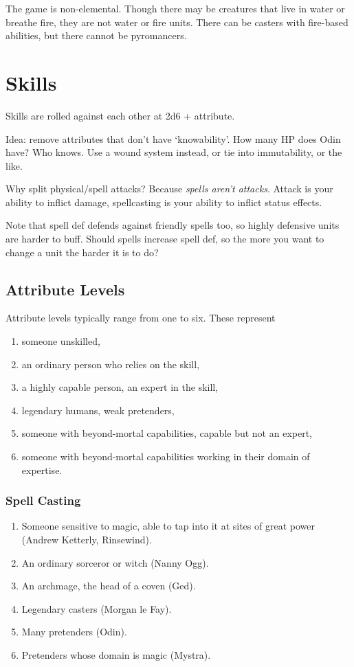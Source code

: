\documentclass[12pt,letterpaper]{article}
\begin{document}
The game is non-elemental.
Though there may be creatures that live in water
or breathe fire, they are not water or fire units.
There can be casters with fire-based abilities,
but there cannot be pyromancers.

\section{Skills}

Skills are rolled against each other at 2d6 + attribute.

Idea: remove attributes that don't have `knowability'.
How many HP does Odin have? Who knows.
Use a wound system instead, or tie into immutability, or the like.

Why split physical/spell attacks?
Because \emph{spells aren't attacks}.
Attack is your ability to inflict damage,
spellcasting is your ability to inflict status effects.

Note that spell def defends against friendly spells too,
so highly defensive units are harder to buff.
Should spells increase spell def,
so the more you want to change a unit the harder it is to do?

\subsection{Attribute Levels}

Attribute levels typically range from one to six.
These represent

\begin{enumerate}
	\item someone unskilled,
	\item an ordinary person who relies on the skill,
	\item a highly capable person, an expert in the skill,
	\item legendary humans, weak pretenders,
	\item someone with beyond-mortal capabilities, capable but not an expert,
	\item someone with beyond-mortal capabilities working in their domain of expertise.
\end{enumerate}

\subsubsection{Spell Casting}

\begin{enumerate}
	\item Someone sensitive to magic, able to tap into it at sites of great power
	      (Andrew Ketterly, Rinsewind).
	\item An ordinary sorceror or witch (Nanny Ogg).
	\item An archmage, the head of a coven (Ged).
	\item Legendary casters (Morgan le Fay).
	\item Many pretenders (Odin).
	\item Pretenders whose domain is magic (Mystra).
\end{enumerate}
\end{document}
